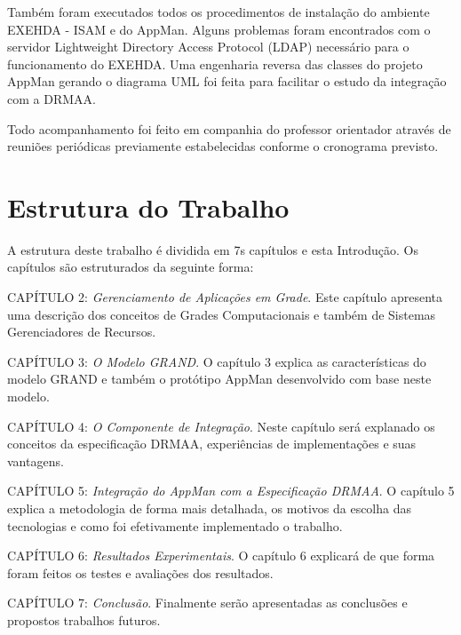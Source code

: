 Também foram executados todos os procedimentos de instalação do ambiente EXEHDA - ISAM e do AppMan. Alguns problemas foram encontrados com o servidor Lightweight Directory Access Protocol (LDAP) necessário para o funcionamento do EXEHDA. Uma engenharia reversa das classes do projeto AppMan gerando o diagrama UML foi feita para facilitar o estudo da integração com a DRMAA.

Todo acompanhamento foi feito em companhia do professor orientador através de reuniões periódicas previamente estabelecidas conforme o cronograma previsto.

\section{Estrutura do Trabalho}
A estrutura deste trabalho é dividida em 7s capítulos e esta Introdução. Os capítulos são estruturados da seguinte forma:

CAPÍTULO 2: \emph{Gerenciamento de Aplicações em Grade}. Este capítulo apresenta uma descrição dos conceitos de Grades Computacionais e também de Sistemas Gerenciadores de Recursos.

CAPÍTULO 3: \emph{O Modelo GRAND}. O capítulo 3 explica as características do modelo GRAND e também o protótipo AppMan desenvolvido com base neste modelo.

CAPÍTULO 4: \emph{O Componente de Integração}. Neste capítulo será explanado os conceitos da especificação DRMAA, experiências de implementações e suas vantagens.

CAPÍTULO 5: \emph{Integração do AppMan com a Especificação DRMAA}. O capítulo 5 explica a metodologia de forma mais detalhada, os motivos da escolha das tecnologias e como foi efetivamente implementado o trabalho.

CAPÍTULO 6: \emph{Resultados Experimentais}. O capítulo 6 explicará de que forma foram feitos os testes e avaliações dos resultados.

CAPÍTULO 7: \emph{Conclusão}. Finalmente serão apresentadas as conclusões e propostos trabalhos futuros.